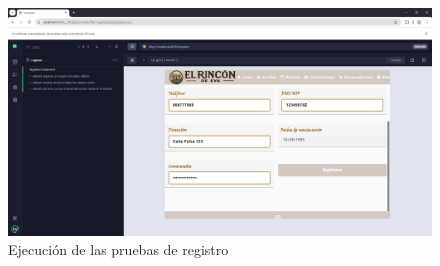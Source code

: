 \begin{itemize}
\begin{figure}[h!tb]
\centering
\includegraphics[width=1\textwidth]{figs/pruebasRegistro.png}
\caption{Ejecución de las pruebas de registro}
\label{fig:pruebas-registro}
\end{figure}


\end{itemize}
